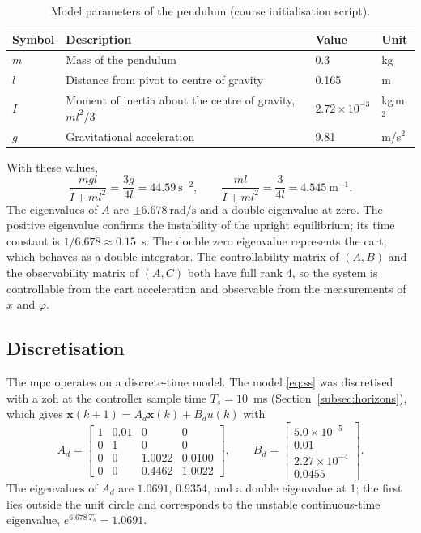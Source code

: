 \begin{table}[ht]
\centering
\caption{Model parameters of the pendulum (course initialisation script).}
\label{tab:params}
\begin{tabular}{llll}
\toprule
Symbol & Description & Value & Unit \\
\midrule
$m$ & Mass of the pendulum & 0.3 & kg \\
$l$ & Distance from pivot to centre of gravity & 0.165 & m \\
$I$ & Moment of inertia about the centre of gravity, $ml^2/3$ & $2.72\times10^{-3}$ & kg\,m$^2$ \\
$g$ & Gravitational acceleration & 9.81 & m/s$^2$ \\
\bottomrule
\end{tabular}
\end{table}

With these values,
\begin{equation}
  \frac{mgl}{I+ml^2} = \frac{3g}{4l} = 44.59~\mathrm{s^{-2}}, \qquad
  \frac{ml}{I+ml^2} = \frac{3}{4l} = 4.545~\mathrm{m^{-1}} .
  \label{eq:numeric}
\end{equation}
The eigenvalues of $A$ are $\pm 6.678~\mathrm{rad/s}$ and a double eigenvalue at
zero. The positive eigenvalue confirms the instability of the upright
equilibrium; its time constant is $1/6.678 \approx 0.15$~s. The double zero
eigenvalue represents the cart, which behaves as a double integrator. The
controllability matrix of $(A,B)$ and the observability matrix of $(A,C)$ both
have full rank 4, so the system is controllable from the cart acceleration and
observable from the measurements of $x$ and $\varphi$.

\subsection{Discretisation}
\label{subsec:discrete}

The \ac{mpc} operates on a discrete-time model. The model \eqref{eq:ss} was
discretised with a \acf{zoh} at the controller sample time
$T_s = 10$~ms (Section~\ref{subsec:horizons}), which gives
$\mathbf{x}(k+1) = A_d\mathbf{x}(k) + B_d u(k)$ with
\begin{equation}
  A_d = \begin{bmatrix}
    1 & 0.01 & 0 & 0\\
    0 & 1 & 0 & 0\\
    0 & 0 & 1.0022 & 0.0100\\
    0 & 0 & 0.4462 & 1.0022
  \end{bmatrix}, \qquad
  B_d = \begin{bmatrix}
    5.0\times10^{-5}\\ 0.01\\ 2.27\times10^{-4}\\ 0.0455
  \end{bmatrix}.
  \label{eq:AdBd}
\end{equation}
The eigenvalues of $A_d$ are $1.0691$, $0.9354$, and a double eigenvalue at
1; the first lies outside the unit circle and corresponds to the unstable
continuous-time eigenvalue, $e^{6.678\,T_s} = 1.0691$.

